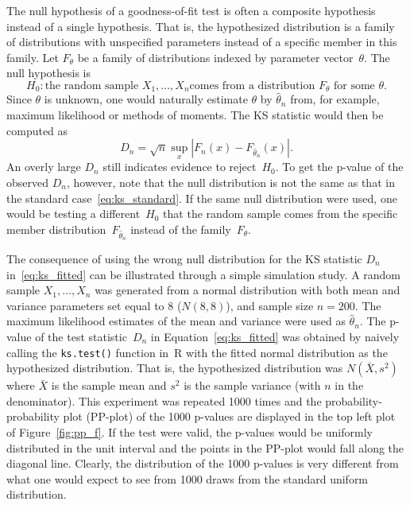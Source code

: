 \documentclass[12pt, letterpaper]{article}
\begin{document}
The null hypothesis of a goodness-of-fit test is often a composite hypothesis
instead of a single hypothesis. That is, the hypothesized distribution is a
family of distributions with unspecified parameters instead of a specific member
in this family. Let $F_\theta$ be a family of distributions indexed by parameter
vector~$\theta$. The null hypothesis is
\[
  H_0: \text{the random sample $X_1, \ldots, X_n$
    comes from a distribution $F_\theta$ for some $\theta$.}
\]
Since $\theta$ is unknown, one would naturally estimate $\theta$ by
$\hat\theta_n$ from, for example, maximum likelihood or methods of moments. The
KS statistic would then be computed as
\begin{equation}
  \label{eq:ks_fitted}
  D_n = \sqrt{n} \sup_x | F_n(x) - F_{\hat\theta_n}(x) |.
\end{equation}
An overly large $D_n$ still indicates evidence to reject~$H_0$. To get the
p-value of the observed $D_n$, however, note that the null distribution is not
the same as that in the standard
case~\eqref{eq:ks_standard}. If the same null distribution were used, one would
be testing a different~$H_0$ that the random sample comes from the specific
member distribution~$F_{\hat\theta_n}$ instead of the family~$F_\theta$.


The consequence of using the wrong null distribution for the KS statistic $D_n$
in~\eqref{eq:ks_fitted} can be illustrated through a simple simulation study. A
random sample $X_1, \ldots, X_n$ was generated from a normal
distribution with both mean and variance parameters set equal to 8 ($N(8,8)$), 
and sample size $n = 200$. The maximum likelihood estimates of the mean and 
variance were used as $\hat\theta_n$. The p-value of the test
statistic~$D_n$ in Equation~\eqref{eq:ks_fitted} was obtained by naively calling 
the \texttt{ks.test()} function in~R with the fitted normal distribution as the
hypothesized distribution. That is, the hypothesized distribution was
$N(\bar X, s^2)$ where $\bar X$ is the sample mean and $s^2$ is the sample
variance (with $n$ in the denominator). This experiment was repeated 1000 times
and the probability-probability plot (PP-plot) of the 1000 p-values are 
displayed in the top left plot of Figure~\ref{fig:pp_f}. If the test were
valid, the p-values would be uniformly distributed in the unit
interval and the points in the PP-plot would fall along the diagonal line. 
Clearly, the distribution of the 1000 p-values is very different from what
one would expect to see from 1000 draws from the standard uniform
distribution.  
\end{document}
